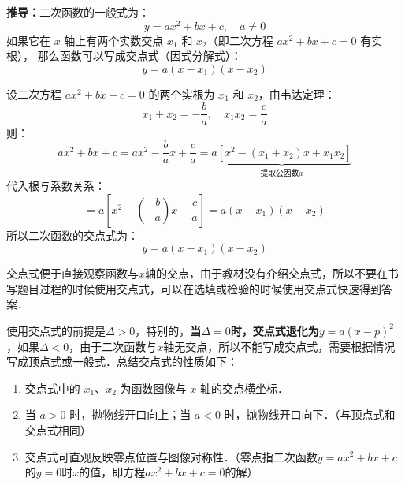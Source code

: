 \textbf{推导：}二次函数的一般式为：
\[
y = ax^2 + bx + c, \quad a \neq 0
\]
如果它在 $x$ 轴上有两个实数交点 $x_1$ 和 $x_2$（即二次方程 $ax^2 + bx + c = 0$ 有实根），
那么函数可以写成交点式（因式分解式）：
\[
y = a(x - x_1)(x - x_2)
\]


设二次方程 $ax^2 + bx + c = 0$ 的两个实根为 $x_1$ 和 $x_2$，由韦达定理：
\[
x_1 + x_2 = -\frac{b}{a}, \quad x_1 x_2 = \frac{c}{a}
\]
则：
\[
ax^2 + bx + c 
= ax^2-\dfrac{b}{a}x+\dfrac{c}{a}
= \underbrace{a\left[x^2 - (x_1 + x_2)x + x_1 x_2\right]}_{\text{提取公因数\(a\)}}
\]
代入根与系数关系：
\[
= a\left[x^2 - \left(-\frac{b}{a}\right)x + \frac{c}{a}\right]
= a\left(x - x_1\right)\left(x - x_2\right)
\]
所以二次函数的交点式为：
\[
y = a(x - x_1)(x - x_2)
\]

交点式便于直接观察函数与\(x\)轴的交点，由于教材没有介绍交点式，所以不要在书写题目过程的时候使用交点式，可以在选填或检验的时候使用交点式快速得到答案．

使用交点式的前提是$\Delta > 0$，特别的，\textbf{当\(\Delta=0\)时，交点式退化为$y = a(x - p)^2$}，如果$\Delta < 0$，由于二次函数与\(x\)轴无交点，所以不能写成交点式，需要根据情况写成顶点式或一般式．总结交点式的性质如下：

\begin{enumerate}
    \item 交点式中的 $x_1$、$x_2$ 为函数图像与 $x$ 轴的交点横坐标．
    \item 当 $a > 0$ 时，抛物线开口向上；当 $a < 0$ 时，抛物线开口向下．（与顶点式和交点式相同）
    \item 交点式可直观反映零点位置与图像对称性．（零点指二次函数\(y=ax^2+bx+c\)的\(y=0\)时\(x\)的值，即方程\(ax^2+bx+c=0\)的解）
\end{enumerate}

